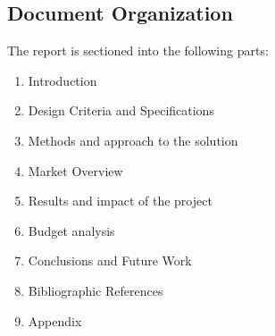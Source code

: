 \subsection{Document Organization}
The report is sectioned into the following parts:
\begin{enumerate}
	\item Introduction
	\item Design Criteria and Specifications
	\item Methods and approach to the solution
	\item Market Overview
	\item Results and impact of the project
	\item Budget analysis
	\item Conclusions and Future Work
	\item Bibliographic References
	\item Appendix
\end{enumerate}